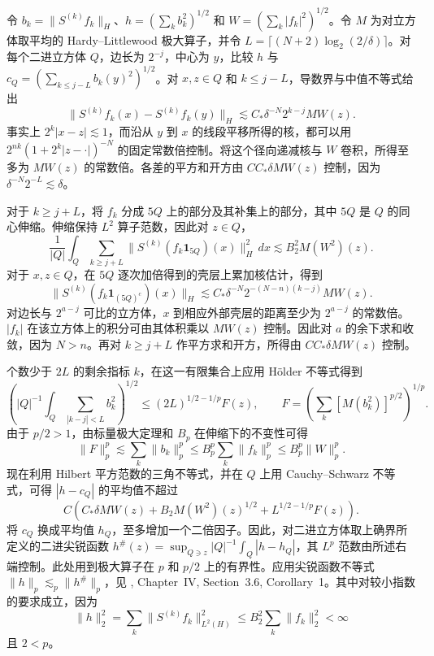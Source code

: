 令 $b_k=\|S^{(k)}f_k\|_H$、$h=(\sum_k b_k^2)^{1/2}$ 和 $W=(\sum_k |f_k|^2)^{1/2}$。令 $M$ 为对立方体取平均的 Hardy--Littlewood 极大算子，并令 $L=\lceil(N+2)\log_2(2/\delta)\rceil$。对每个二进立方体 $Q$，边长为 $2^{-j}$，中心为 $y$，比较 $h$ 与 $c_Q=(\sum_{k\le j-L} b_k(y)^2)^{1/2}$。对 $x,z\in Q$ 和 $k\le j-L$，导数界与中值不等式给出
\[
 \|S^{(k)}f_k(x)-S^{(k)}f_k(y)\|_H
 \lesssim C_*\delta^{-N}2^{k-j}MW(z).
\]
事实上 $2^k|x-z|\lesssim1$，而沿从 $y$ 到 $x$ 的线段平移所得的核，都可以用 $2^{nk}(1+2^k|z-\cdot|)^{-N}$ 的固定常数倍控制。将这个径向递减核与 $W$ 卷积，所得至多为 $MW(z)$ 的常数倍。各差的平方和开方由 $CC_*\delta MW(z)$ 控制，因为 $\delta^{-N}2^{-L}\lesssim\delta$。

对于 $k\ge j+L$，将 $f_k$ 分成 $5Q$ 上的部分及其补集上的部分，其中 $5Q$ 是 $Q$ 的同心伸缩。伸缩保持 $L^2$ 算子范数，因此对 $z\in Q$，
\[
 \frac1{|Q|}\int_Q\sum_{k\ge j+L}
 \|S^{(k)}(f_k\mathbf1_{5Q})(x)\|_H^2\,dx
 \lesssim B_2^2 M(W^2)(z).
\]
对于 $x,z\in Q$，在 $5Q$ 逐次加倍得到的壳层上累加核估计，得到
\[
 \|S^{(k)}(f_k\mathbf1_{(5Q)^c})(x)\|_H
 \lesssim C_*\delta^{-N}2^{-(N-n)(k-j)} MW(z).
\]
对边长与 $2^{a-j}$ 可比的立方体，$x$ 到相应外部壳层的距离至少为 $2^{a-j}$ 的常数倍。$|f_k|$ 在该立方体上的积分可由其体积乘以 $MW(z)$ 控制。因此对 $a$ 的余下求和收敛，因为 $N>n$。再对 $k\ge j+L$ 作平方求和开方，所得由 $CC_*\delta MW(z)$ 控制。

个数少于 $2L$ 的剩余指标 $k$，在这一有限集合上应用 Hölder 不等式得到
\[
 \left(|Q|^{-1}\int_Q\sum_{|k-j|<L}b_k^2\right)^{1/2}
 \le(2L)^{1/2-1/p}F(z),\qquad
 F=\left(\sum_k[M(b_k^2)]^{p/2}\right)^{1/p}.
\]
由于 $p/2>1$，由标量极大定理和 $B_p$ 在伸缩下的不变性可得
\[
 \|F\|_p^p\lesssim\sum_k\|b_k\|_p^p
 \le B_p^p\sum_k\|f_k\|_p^p\le B_p^p\|W\|_p^p.
\]
现在利用 Hilbert 平方范数的三角不等式，并在 $Q$ 上用 Cauchy--Schwarz 不等式，可得 $|h-c_Q|$ 的平均值不超过
\[
 C\left(C_*\delta MW(z)+B_2M(W^2)(z)^{1/2}
       +L^{1/2-1/p}F(z)\right).
\]
将 $c_Q$ 换成平均值 $h_Q$，至多增加一个二倍因子。因此，对二进立方体取上确界所定义的二进尖锐函数 $h^\#(z)=\sup_{Q\ni z}|Q|^{-1}\int_Q|h-h_Q|$，其 $L^p$ 范数由所述右端控制。此处用到极大算子在 $p$ 和 $p/2$ 上的有界性。应用尖锐函数不等式 $\|h\|_p\lesssim_p\|h^\#\|_p$，见 \cite{r-74}, Chapter~IV, Section~3.6, Corollary~1。其中对较小指数的要求成立，因为
\[
 \|h\|_2^2=\sum_k\|S^{(k)}f_k\|_{L^2(H)}^2
 \le B_2^2\sum_k\|f_k\|_2^2<\infty
\]
且 $2<p$。
